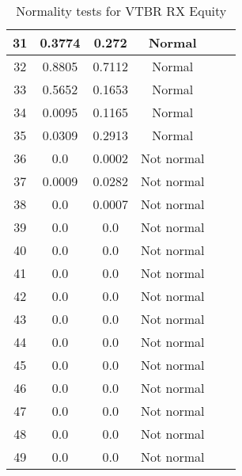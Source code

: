 \begin{table}[h]
\begin{tabular}{|c|c|c|c|c|c|}
		31 & 0.3774 & 0.272 & Normal\\\hline
		32 & 0.8805 & 0.7112 & Normal\\\hline
		33 & 0.5652 & 0.1653 & Normal\\\hline
		34 & 0.0095 & 0.1165 & Normal\\\hline
		35 & 0.0309 & 0.2913 & Normal\\\hline
		36 & 0.0 & 0.0002 & Not normal\\\hline
		37 & 0.0009 & 0.0282 & Not normal\\\hline
		38 & 0.0 & 0.0007 & Not normal\\\hline
		39 & 0.0 & 0.0 & Not normal\\\hline
		40 & 0.0 & 0.0 & Not normal\\\hline
		41 & 0.0 & 0.0 & Not normal\\\hline
		42 & 0.0 & 0.0 & Not normal\\\hline
		43 & 0.0 & 0.0 & Not normal\\\hline
		44 & 0.0 & 0.0 & Not normal\\\hline
		45 & 0.0 & 0.0 & Not normal\\\hline
		46 & 0.0 & 0.0 & Not normal\\\hline
		47 & 0.0 & 0.0 & Not normal\\\hline
		48 & 0.0 & 0.0 & Not normal\\\hline
		49 & 0.0 & 0.0 & Not normal\\\hline
	\end{tabular}
	\caption{Normality tests for VTBR RX Equity}
	\label{tab:normality_tests_VTBR_}
\end{table}

